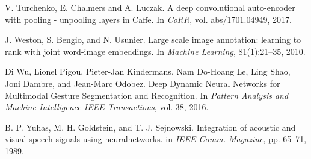 \begin{thebibliography}{99}
  V. Turchenko, E. Chalmers and A. Luczak. A deep convolutional auto-encoder
  with pooling - unpooling layers in Caffe. In \textit{CoRR},
  vol. abs/1701.04949, 2017.

  J. Weston, S. Bengio, and N. Usunier. 
  Large scale image annotation: learning to rank with joint word-image
  embeddings. In \textit{Machine Learning}, 81(1):21--35, 2010.

  Di Wu, Lionel Pigou, Pieter-Jan Kindermans, Nam Do-Hoang Le, Ling Shao,
  Joni Dambre, and Jean-Marc Odobez. 
  Deep Dynamic Neural Networks for Multimodal Gesture Segmentation and
  Recognition. In \textit{Pattern Analysis and Machine Intelligence
  IEEE Transactions}, vol. 38, 2016.

  B. P. Yuhas, M. H. Goldstein, and T. J. Sejnowski. Integration of acoustic
  and visual speech signals using neuralnetworks. in \textit{IEEE Comm.
  Magazine}, pp. 65--71, 1989.

\end{thebibliography}
